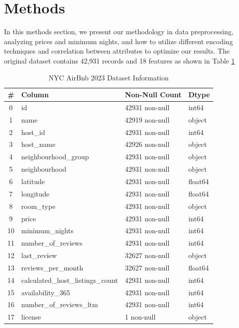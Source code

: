 \documentclass[a4paper,12pt]{article}
\begin{document}
\section*{Methods}

In this methods section, we present our methodology in data preprocessing,
analyzing prices and minimum nights, and how to utilize different encoding techniques and correlation between attributes to optimize our results.
The original dataset contains 42,931 records and 18 features as shown in Table \ref{tab:dataframe_overview}

\begin{table}[h!]
\centering
\begin{tabular}{|c|l|l|l|}
\hline
\textbf{\#} & \textbf{Column} & \textbf{Non-Null Count} & \textbf{Dtype} \\ \hline
0 & id & 42931 non-null & int64 \\ \hline
1 & name & 42919 non-null & object \\ \hline
2 & host\_id & 42931 non-null & int64 \\ \hline
3 & host\_name & 42926 non-null & object \\ \hline
4 & neighbourhood\_group & 42931 non-null & object \\ \hline
5 & neighbourhood & 42931 non-null & object \\ \hline
6 & latitude & 42931 non-null & float64 \\ \hline
7 & longitude & 42931 non-null & float64 \\ \hline
8 & room\_type & 42931 non-null & object \\ \hline
9 & price & 42931 non-null & int64 \\ \hline
10 & minimum\_nights & 42931 non-null & int64 \\ \hline
11 & number\_of\_reviews & 42931 non-null & int64 \\ \hline
12 & last\_review & 32627 non-null & object \\ \hline
13 & reviews\_per\_month & 32627 non-null & float64 \\ \hline
14 & calculated\_host\_listings\_count & 42931 non-null & int64 \\ \hline
15 & availability\_365 & 42931 non-null & int64 \\ \hline
16 & number\_of\_reviews\_ltm & 42931 non-null & int64 \\ \hline
17 & license & 1 non-null & object \\ \hline
\end{tabular}
\caption{NYC AirBnb 2023 Dataset Information}
\label{tab:dataframe_overview}
\end{table}
\end{document}
